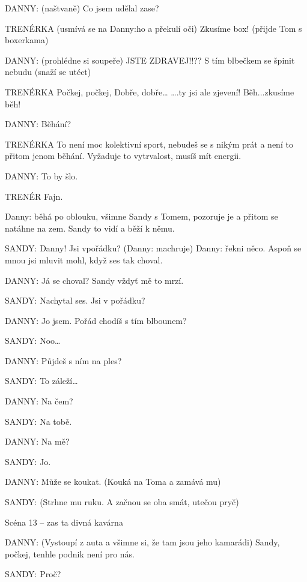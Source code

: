 \rep DANNY:          (naštvaně) Co jsem udělal zase?

TRENÉRKA         (usmívá se na \rep Danny:ho a překulí oči)    Zkusíme box! (přijde Tom s                 boxerkama)

\rep DANNY:         (prohlédne si soupeře) JSTE ZDRAVEJ!!?? S tím blbečkem se špinit                 nebudu (snaží se utéct)

TRENÉRKA          Počkej, počkej,  Dobře, dobře… ….ty jsi ale zjevení!  Běh...zkusíme běh!

\rep DANNY:        Běhání? 

TRENÉRKA          To není moc kolektivní sport, nebudeš se s nikým prát a není to přitom         jenom běhání. Vyžaduje to vytrvalost, musíš mít energii. 

\rep DANNY:        To by šlo. 

TRENÉR        Fajn. 

\rep Danny: běhá po oblouku, všimne Sandy s Tomem, pozoruje je a přitom se natáhne na zem. Sandy to vidí a běží k němu. 

\rep SANDY:        Danny! Jsi vpořádku? (\rep Danny: machruje) \rep Danny: řekni něco.  Aspoň se         mnou jsi mluvit mohl, když ses tak choval. 

\rep DANNY:        Já se choval? Sandy vždyť mě to mrzí. 

\rep SANDY:        Nachytal ses.  Jsi v pořádku? 

\rep DANNY:        Jo jsem. Pořád chodíš s tím blbounem? 

\rep SANDY:        Noo…

\rep DANNY:        Půjdeš s ním na ples? 

\rep SANDY:        To záleží…

\rep DANNY:        Na čem? 

\rep SANDY:        Na tobě. 

\rep DANNY:        Na mě? 

\rep SANDY:        Jo. 

\rep DANNY:        Může se koukat. (Kouká na Toma a zamává mu)

\rep SANDY:        (Strhne mu ruku. A začnou se oba smát, utečou pryč) 

Scéna 13 – zas ta divná kavárna 

\rep DANNY:         (Vystoupí z auta a všimne si, že tam jsou jeho kamarádi) Sandy, počkej,           tenhle podnik není pro nás. 

\rep SANDY:         Proč? 

